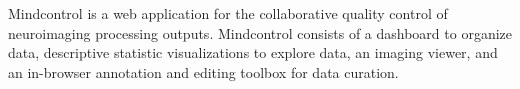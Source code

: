Mindcontrol is a web application for the collaborative quality control of neuroimaging processing outputs. Mindcontrol consists of a dashboard to organize data, descriptive statistic visualizations to explore data, an imaging viewer, and an in-browser annotation and editing toolbox for data curation. 